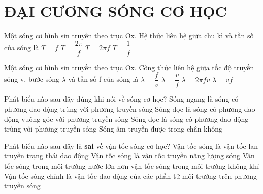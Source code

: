 \section{ĐẠI CƯƠNG SÓNG CƠ HỌC}
\begin{ex}%
 Một sóng cơ hình sin truyền theo trục Ox. Hệ thức liên hệ giữa chu kì và tần số của sóng là
\choice
{$T = f$}
{$T = \dfrac {2 \pi} {f}$}
{$T = 2\pi f$}
{\True $T = \dfrac{1}{f}$}
\end{ex} 
\begin{ex}%

 Một sóng cơ hình sin truyền theo trục Ox. Công thức liên hệ giữa tốc độ truyền sóng v, bước sóng $\lambda$ và tần số f của sóng là
\choice
{$\lambda =\dfrac{f}{v}$}
{\True $\lambda =\dfrac{v}{f}$}
{$\lambda = 2\pi fv$}
{$\lambda = vf$}
\end{ex} 
\begin{ex}%
Phát biểu nào sau đây đúng khi nói về sóng cơ học?
\choice
{Sóng ngang là sóng có phương dao động trùng với phương truyền sóng}
{Sóng dọc là sóng có phương dao động vuông góc với phương truyền sóng}
{\True Sóng dọc là sóng có phương dao động trùng với phương truyền sóng}
{Sóng âm truyền được trong chân không}
\end{ex} 
\begin{ex}%
Phát biểu nào sau đây là \textbf{sai} về vận tốc sóng cơ học?
\choice
{Vận tốc sóng là vận tốc lan truyền trạng thái dao động}
{Vận tốc sóng là vận tốc truyền năng lượng sóng}
{Vận tốc sóng trong môi trường nước lớn hơn vận tốc sóng trong môi trường không khí}
{\True Vận tốc sóng chính là vận tốc dao động của các phần tử môi trường trên phương truyền sóng}
\end{ex} 
